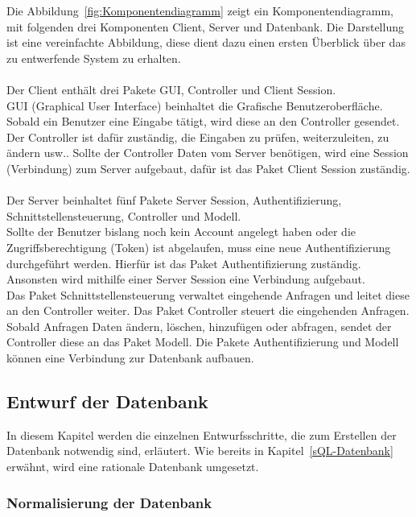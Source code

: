 Die Abbildung~\ref{fig:Komponentendiagramm} zeigt ein Komponentendiagramm, mit folgenden drei Komponenten Client, Server und Datenbank. 
Die Darstellung ist eine vereinfachte Abbildung, diese dient dazu einen ersten Überblick über das zu entwerfende System zu erhalten. 
\\
\\
Der Client enthält drei Pakete GUI, Controller und Client Session. 
\\
GUI (Graphical User Interface) beinhaltet die Grafische Benutzeroberfläche.
\\
Sobald ein Benutzer eine Eingabe tätigt, wird diese an den Controller gesendet. Der Controller ist dafür zuständig, die Eingaben zu prüfen, weiterzuleiten, zu ändern usw.. Sollte der Controller Daten vom Server benötigen, wird eine Session (Verbindung) zum Server aufgebaut, dafür ist das Paket Client Session zuständig.
\\
\\
Der Server beinhaltet fünf Pakete Server Session, Authentifizierung, Schnittstellensteuerung, Controller und Modell. 
\\
Sollte der Benutzer bislang noch kein Account angelegt haben oder die Zugriffsberechtigung (Token) ist abgelaufen, muss eine neue Authentifizierung durchgeführt werden. Hierfür ist das Paket Authentifizierung zuständig.
\\
Ansonsten wird mithilfe einer Server Session eine Verbindung aufgebaut. 
 \\
Das Paket Schnittstellensteuerung verwaltet eingehende Anfragen und leitet diese an den Controller weiter. Das Paket Controller steuert die eingehenden Anfragen. Sobald Anfragen Daten ändern, löschen, hinzufügen oder abfragen, sendet der Controller diese an das Paket Modell. Die Pakete Authentifizierung und Modell können eine Verbindung zur Datenbank aufbauen.

\subsection{Entwurf der Datenbank}\label{entwurf_der_Datenbank}

In diesem Kapitel werden die einzelnen Entwurfsschritte, die zum Erstellen der Datenbank notwendig sind, erläutert. 
Wie bereits in Kapitel~\ref{sQL-Datenbank} erwähnt, wird eine rationale Datenbank umgesetzt.

\subsubsection{Normalisierung der Datenbank}\label{normalisierung}

